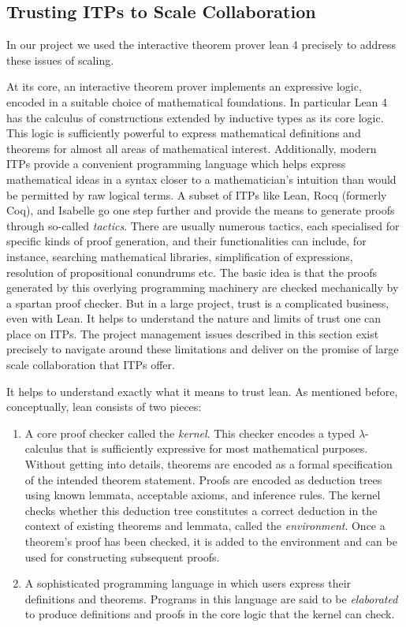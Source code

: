 \subsection{Trusting ITPs to Scale Collaboration}
In our project we used the interactive theorem prover lean 4 \cite{the_lean4_paper} precisely to address these issues of scaling.

At its core, an interactive theorem prover implements an expressive logic, encoded in a suitable choice of mathematical foundations. In particular Lean 4 has the calculus of constructions extended by inductive types as its core logic. This logic is sufficiently powerful to express mathematical definitions and theorems for almost all areas of mathematical interest. Additionally, modern ITPs provide a convenient programming language which helps express mathematical ideas in a syntax closer to a mathematician's intuition than would be permitted by raw logical terms. A subset of ITPs like Lean, Rocq (formerly Coq), and Isabelle go one step further and provide the means to generate proofs through so-called \emph{tactics}. There are usually numerous tactics, each specialised for specific kinds of proof generation, and their functionalities can include, for instance, searching mathematical libraries, simplification of expressions, resolution of propositional conundrums etc. The basic idea is that the proofs generated by this overlying programming machinery are checked mechanically by a spartan proof checker. But in a large project, trust is a complicated business, even with Lean. It helps to understand the nature and limits of trust one can place on ITPs. The project management issues described in this section exist precisely to navigate around these limitations and deliver on the promise of large scale collaboration that ITPs offer.

It helps to understand exactly what it means to trust lean. As mentioned before, conceptually, lean consists of two pieces:

\begin{enumerate}
    \item A core proof checker called the \emph{kernel}. This checker encodes a typed $\lambda$-calculus that is sufficiently expressive for most mathematical purposes. Without getting into details, theorems are encoded as a formal specification of the intended theorem statement. Proofs are encoded as deduction trees using known lemmata, acceptable axioms, and inference rules. The kernel checks whether this deduction tree constitutes a correct deduction in the context of existing theorems and lemmata, called the \emph{environment}. Once a theorem's proof has been checked, it is added to the environment and can be used for constructing subsequent proofs.
    \item A sophisticated programming language in which users express their definitions and theorems. Programs in this language are said to  be \emph{elaborated} to produce definitions and proofs in the core logic that the kernel can check.
\end{enumerate}

